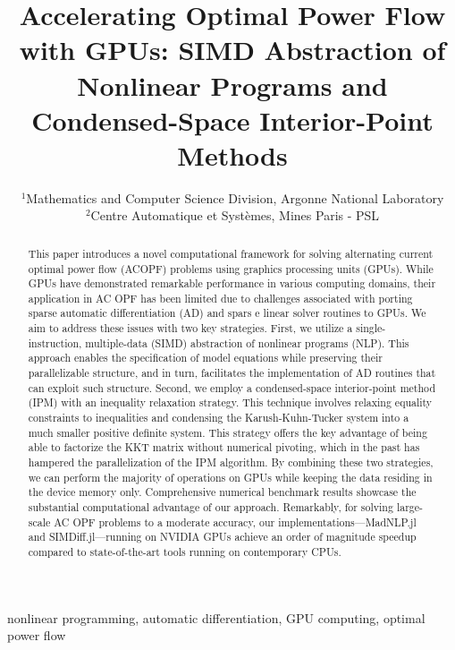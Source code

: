 % 
\title{Accelerating Optimal Power Flow with GPUs: SIMD Abstraction of Nonlinear Programs and Condensed-Space Interior-Point Methods
}


\date{\small
  $^{1}$Mathematics and Computer Science Division, Argonne National Laboratory\\
  $^{2}$Centre Automatique et Syst\`{e}mes, Mines Paris - PSL
}

\maketitle
\begin{abstract}
  This paper introduces a novel computational framework for solving
alternating current optimal power flow (ACOPF) problems using
graphics processing units (GPUs). While GPUs have demonstrated
remarkable performance in various computing domains, their application
in AC OPF has been limited due to challenges associated with porting
sparse automatic differentiation (AD) and spars e linear solver
routines to GPUs. We aim to address these issues with two key
strategies. First, we utilize a single-instruction, multiple-data
(SIMD) abstraction of nonlinear programs (NLP). This approach enables
the specification of model equations while preserving their
parallelizable structure, and in turn, facilitates the implementation
of AD routines that can exploit such structure. Second, we employ a
condensed-space interior-point method (IPM) with an inequality
relaxation strategy. This technique involves relaxing equality
constraints to inequalities and condensing the Karush-Kuhn-Tucker
system into a much smaller positive definite system. This strategy
offers the key advantage of being able to factorize the KKT matrix
without numerical pivoting, which in the past has hampered the parallelization of
the IPM algorithm. By combining these two strategies, we can perform the
majority of operations on GPUs while keeping the data residing in the
device memory only. Comprehensive numerical benchmark results showcase
the substantial computational advantage of our approach. Remarkably,
for solving large-scale AC OPF problems to a moderate accuracy, our
implementations—MadNLP.jl and SIMDiff.jl—running on NVIDIA GPUs
achieve an order of magnitude speedup compared to state-of-the-art
tools running on contemporary CPUs.
\end{abstract}

\begin{IEEEkeywords}
  nonlinear programming, automatic differentiation, GPU computing, optimal power flow
\end{IEEEkeywords}
